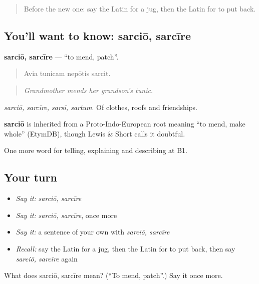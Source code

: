 \begin{quote}
Before the new one: say the Latin for a jug, then the Latin for to put back.
\end{quote}

\subsection*{You'll want to know: sarciō, sarcīre}
\textbf{sarciō, sarcīre} — \textquotedblleft{}to mend, patch\textquotedblright{}.

\begin{quote}
Avia tunicam nepōtis sarcit.
\end{quote}

\begin{quote}
\emph{Grandmother mends her grandson's tunic.}
\end{quote}

\emph{sarciō, sarcīre, sarsī, sartum}. Of clothes, roofs and friendships.

\begin{cousinweb}
\textbf{sarciō} is inherited from a Proto-Indo-European root meaning \textquotedblleft{}to mend, make whole\textquotedblright{} (EtymDB), though Lewis \& Short calls it doubtful.
\end{cousinweb}

\begin{grammarlens}[title={What you've built}]
One more word for telling, explaining and describing at B1.
\end{grammarlens}

\subsection*{Your turn}
\begin{itemize}
\raggedright
  \item \emph{Say it:} \emph{sarciō, sarcīre}
  \item \emph{Say it:} \emph{sarciō, sarcīre}, once more
  \item \emph{Say it:} a sentence of your own with \emph{sarciō, sarcīre}
  \item \emph{Recall:} say the Latin for a jug, then the Latin for to put back, then say \emph{sarciō, sarcīre} again
\end{itemize}

\begin{tcolorbox}[breakable,colback=teal!4,colframe=teal!35!black,title={Before you move on}]
What does sarciō, sarcīre mean? (\textquotedblleft{}To mend, patch\textquotedblright{}.) Say it once more.
\end{tcolorbox}
